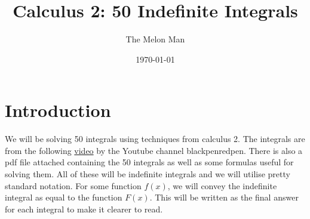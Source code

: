 \documentclass[12pt]{article}
\title{Calculus 2: 50 Indefinite Integrals}
\author{The Melon Man}
\date{\today}
\begin{document}
\maketitle

\section{Introduction}

We will be solving 50 integrals using techniques from calculus 2.
The integrals are from the following \href{https://youtu.be/XOUwIdufY9Y}{video} by the Youtube channel blackpenredpen.
There is also a pdf file attached containing the 50 integrals as well as some formulas useful for solving them.
All of these will be indefinite integrals and we will utilise pretty standard notation.
For some function $f(x)$, we will convey the indefinite integral as equal to the function $F(x)$.
This will be written as the final answer for each integral to make it clearer to read.
\end{document}

